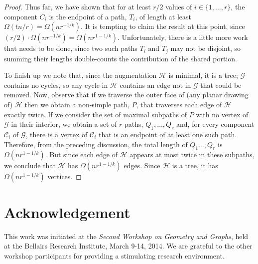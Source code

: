 \documentclass{patmorin}
\begin{document}
\begin{proof}
Thus far, we have shown that for at least $r/2$ values of
$i\in\{1,\ldots,r\}$, the component $C_i$ is the endpoint of a
path, $T_i$, of length at least $\Omega(tn/r)=\Omega(nr^{-1/k})$.
It is tempting to claim the result at this point, since
$(r/2)\cdot\Omega(nr^{-1/k})=\Omega(nr^{1-1/k})$. Unfortunately, there
is a little more work that needs to be done, since two such paths $T_i$
and $T_j$ may not be disjoint, so summing their lengths double-counts
the contribution of the shared portion.

To finish up we note that, since the augmentation $\mathcal{H}$ is minimal,
it is a tree; $\mathcal G$ contains no cycles, so any cycle in $\mathcal H$ contains an edge not in $\mathcal G$ that could be removed.  Now, observe that if we traverse the outer face of (any planar drawing of) $\mathcal H$ then we obtain a non-simple path, $P$, that traverses each edge of $\mathcal{H}$ exactly twice. If we consider the set of maximal subpaths of $P$ with no vertex of $\mathcal G$ in their interior, we obtain a set of $r$ paths, $Q_1,\ldots,Q_{r}$ and, for every component $\mathcal C_i$ of $\mathcal G$, there is a vertex of $\mathcal C_i$ that is an endpoint of at least one such path.  Therefore, from the preceding discussion, the total length of $Q_1\ldots,Q_{r}$ is $\Omega(nr^{1-1/k})$.  But since each edge of $\mathcal H$ appears at most twice in these subpaths, we conclude that $\mathcal H$ has $\Omega(nr^{1-1/k})$ edges.  Since $\mathcal H$ is a tree, it has $\Omega(nr^{1-1/k})$ vertices.
\end{proof}

\newpage

\section*{Acknowledgement}
This work was initiated at the \emph{Second Workshop on Geometry and Graphs},
held at the Bellairs Research Institute, March 9-14, 2014.  We are
grateful to the other workshop participants for providing a stimulating
research environment.



\end{document}
